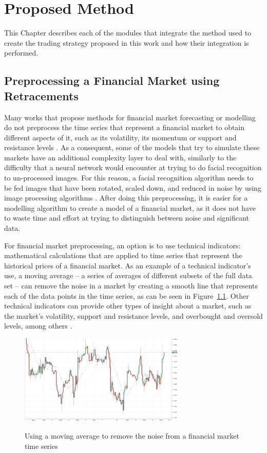 \chapter{Proposed Method}
\label{chapter:proposed-method}

This Chapter describes each of the modules that integrate the method used to
create the trading strategy proposed in this work and how their integration is
performed.

\section{Preprocessing a Financial Market using Retracements}
\label{section:preprocessing-a-financial-market-using-retracements}

Many works that propose methods for financial market forecasting or modelling do
not preprocess the time series that represent a financial market to obtain
different aspects of it, such as its volatility, its momentum or support and
resistance levels \cite{Elliott2016}. As a consequent, some of the models that
try to simulate these markets have an additional complexity layer to deal with,
similarly to the difficulty that a neural network would encounter at trying to
do facial recognition to un-processed images. For this reason, a facial
recognition algorithm needs to be fed images that have been rotated, scaled
down, and reduced in noise by using image processing algorithms
\cite{Bieniecki2007} \cite{Heseltine2003}. After doing this preprocessing, it is
easier for a modelling algorithm to create a model of a financial market, as it
does not have to waste time and effort at trying to distinguish between noise
and significant data.

For financial market preprocessing, an option is to use technical indicators:
mathematical calculations that are applied to time series that represent the
historical prices of a financial market. As an example of a technical
indicator's use, a moving average -- a series of averages of different subsets
of the full data set -- can remove the noise in a market by creating a smooth
line that represents each of the data points in the time series, as can be seen
in Figure~\ref{figure:moving-average-noise}. Other technical indicators can
provide other types of insight about a market, such as the market's volatility,
support and resistance levels, and overbought and oversold levels, among others
\cite{Vora2011}.

\begin{figure}
\caption{Using a moving average to remove the noise from a financial market time
  series} \centering
\includegraphics[width=0.7\textwidth]{img/moving-average.png}
\label{figure:moving-average-noise}
\end{figure}

